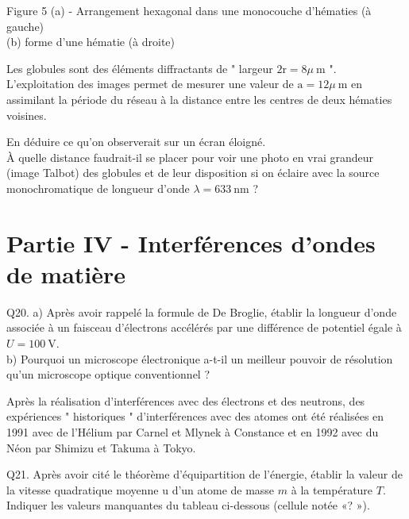 \documentclass[10pt]{article}
\begin{document}
Figure 5 (a) - Arrangement hexagonal dans une monocouche d'hématies (à gauche)\\
(b) forme d'une hématie (à droite)

Les globules sont des éléments diffractants de " largeur \(2 \mathrm{r}=8 \mu \mathrm{~m}\) ". L'exploitation des images permet de mesurer une valeur de \(\mathrm{a}=12 \mu \mathrm{~m}\) en assimilant la période du réseau à la distance entre les centres de deux hématies voisines.

En déduire ce qu'on observerait sur un écran éloigné.\\
À quelle distance faudrait-il se placer pour voir une photo en vrai grandeur (image Talbot) des globules et de leur disposition si on éclaire avec la source monochromatique de longueur d'onde \(\lambda=633 \mathrm{~nm}\) ?

\section*{Partie IV - Interférences d'ondes de matière}
Q20. a) Après avoir rappelé la formule de De Broglie, établir la longueur d'onde associée à un faisceau d'électrons accélérés par une différence de potentiel égale à \(U=100 \mathrm{~V}\).\\
b) Pourquoi un microscope électronique a-t-il un meilleur pouvoir de résolution qu'un microscope optique conventionnel ?

Après la réalisation d'interférences avec des électrons et des neutrons, des expériences " historiques " d'interférences avec des atomes ont été réalisées en 1991 avec de l'Hélium par Carnel et Mlynek à Constance et en 1992 avec du Néon par Shimizu et Takuma à Tokyo.

Q21. Après avoir cité le théorème d'équipartition de l'énergie, établir la valeur de la vitesse quadratique moyenne u d'un atome de masse \(m\) à la température \(T\). Indiquer les valeurs manquantes du tableau ci-dessous (cellule notée «? »).
\end{document}
